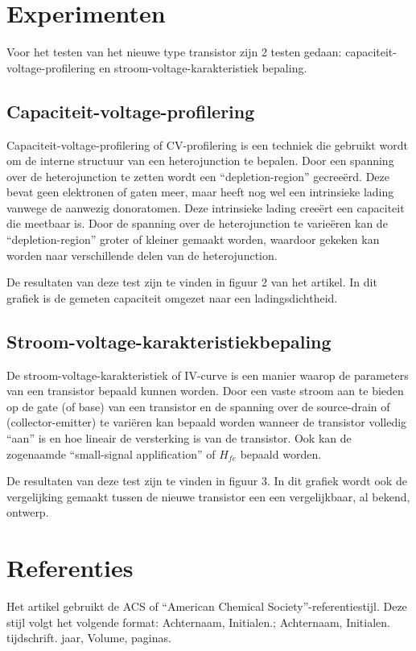 \documentclass[11pt]{article}
\begin{document}
\newpage

\section{Experimenten}
Voor het testen van het nieuwe type transistor zijn 2 testen gedaan: capaciteit-voltage-profilering en stroom-voltage-karakteristiek bepaling.

\subsection{Capaciteit-voltage-profilering}
Capaciteit-voltage-profilering of CV-profilering is een techniek die gebruikt wordt om de interne structuur van een heterojunction te bepalen. Door een spanning over de heterojunction te zetten wordt een ``depletion-region'' gecree\"erd. Deze bevat geen elektronen of gaten meer, maar heeft nog wel een intrinsieke lading vanwege de aanwezig donoratomen. Deze intrinsieke lading cree\"ert een capaciteit die meetbaar is. Door de spanning over de heterojunction te varie\"eren kan de ``depletion-region'' groter of kleiner gemaakt worden, waardoor gekeken kan worden naar verschillende delen van de heterojunction.

De resultaten van deze test zijn te vinden in figuur 2 van het artikel. In dit grafiek is de gemeten capaciteit omgezet naar een ladingsdichtheid.

\subsection{Stroom-voltage-karakteristiekbepaling}
De stroom-voltage-karakteristiek of IV-curve is een manier waarop de parameters van een transistor bepaald kunnen worden. Door een vaste stroom aan te bieden op de gate (of base) van een transistor en de spanning over de source-drain of (collector-emitter) te vari\"eren kan bepaald worden wanneer de transistor volledig ``aan'' is en hoe lineair de versterking is van de transistor. Ook kan de zogenaamde ``small-signal applification'' of $H_{fe}$ bepaald worden.

De resultaten van deze test zijn te vinden in figuur 3. In dit grafiek wordt ook de vergelijking gemaakt tussen de nieuwe transistor een een vergelijkbaar, al bekend, ontwerp.

\section{Referenties}
Het artikel gebruikt de ACS of ``American Chemical Society''-referentiestijl. Deze stijl volgt het volgende format: Achternaam, Initialen.; Achternaam, Initialen. tijdschrift. jaar, Volume, paginas. 
\end{document}
